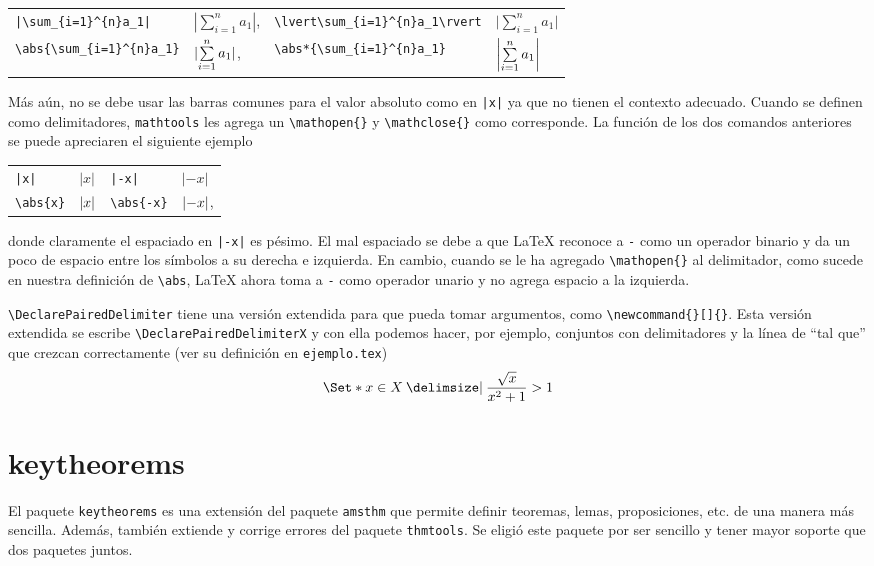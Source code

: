 \begin{tabular}{llll}
  \verb+|\sum_{i=1}^{n}a_1|+ & \(|\sum\limits_{i=1}^{n}a_1|\), &
  \verb|\lvert\sum_{i=1}^{n}a_1\rvert| &
  \(\lvert\sum\limits_{i=1}^{n}a_1\rvert \) \\[4ex]
  \verb|\abs{\sum_{i=1}^{n}a_1}| & \(\abs{\sum\limits_{i=1}^{n}a_1}\), &
  \verb|\abs*{\sum_{i=1}^{n}a_1}| & \(\abs*{\sum\limits_{i=1}^{n}a_1}\)
\end{tabular}

Más aún, no se debe usar las barras comunes para el valor absoluto como en
\verb+|x|+ ya que no tienen el contexto adecuado. Cuando se definen como
delimitadores, \texttt{mathtools} les agrega un \verb|\mathopen{}| y
\verb|\mathclose{}| como corresponde. La función de los dos comandos anteriores
se puede apreciaren el siguiente ejemplo

\begin{tabular}{llll}
  \verb+|x|+ & \(|x|\) & \verb¡|-x|¡ & \(|-x|\)\\
  \verb+\abs{x}+ & \(\abs{x}\) & \verb+\abs{-x}+ & \(\abs{-x}\),
\end{tabular}

\noindent donde claramente el espaciado en \verb¡|-x|¡ es pésimo. El mal
espaciado se debe a que \LaTeX{} reconoce a \verb|-| como un operador binario y
da un poco de espacio entre los símbolos a su derecha e izquierda. En cambio,
cuando se le ha agregado \verb|\mathopen{}| al delimitador, como sucede en
nuestra definición de \verb|\abs|, \LaTeX{} ahora toma a \verb|-| como operador
unario y no agrega espacio a la izquierda.

\verb|\DeclarePairedDelimiter| tiene una versión extendida para que pueda
tomar argumentos, como \verb|\newcommand{}[]{}|. Esta versión extendida se
escribe \verb|\DeclarePairedDelimiterX| y con ella podemos hacer, por
ejemplo, conjuntos  con delimitadores y la línea de \enquote{tal que} que
crezcan correctamente (ver su definición en \texttt{ejemplo.tex})
\[
  \Set*{ x \in X \given \frac{\sqrt{x}}{x^2+1} > 1 }
\]


\section{keytheorems}
El paquete \texttt{keytheorems} es una extensión del paquete \texttt{amsthm} que
permite definir teoremas, lemas, proposiciones, etc. de una manera más sencilla.
Además, también extiende y corrige errores del paquete \texttt{thmtools}. Se
eligió este paquete por ser sencillo y tener mayor soporte que dos paquetes
juntos.

